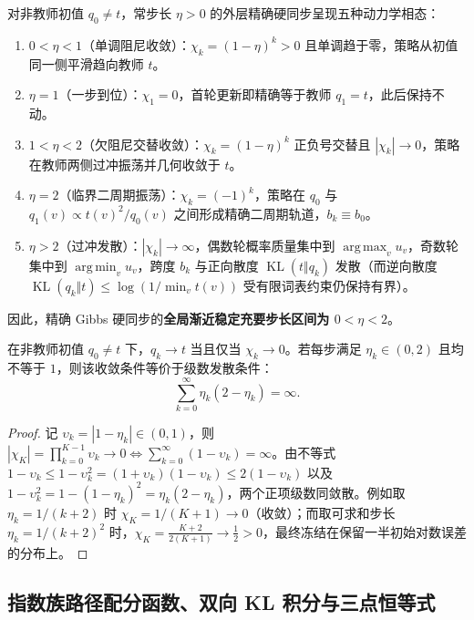 \documentclass[lang=cn,scheme=chinese,openany]{elegantbook}
\newcommand{\KL}{\operatorname{KL}}
\DeclareMathOperator*{\argmax}{arg\,max}
\DeclareMathOperator*{\argmin}{arg\,min}
\begin{document}
\begin{corollary}
对非教师初值 $q_0\ne t$，常步长 $\eta>0$ 的外层精确硬同步呈现五种动力学相态：
\begin{enumerate}
 \item $0<\eta<1$（单调阻尼收敛）：$\chi_k=(1-\eta)^k>0$ 且单调趋于零，策略从初值同一侧平滑趋向教师 $t$。
 \item $\eta=1$（一步到位）：$\chi_1=0$，首轮更新即精确等于教师 $q_1=t$，此后保持不动。
 \item $1<\eta<2$（欠阻尼交替收敛）：$\chi_k=(1-\eta)^k$ 正负号交替且 $|\chi_k|\to 0$，策略在教师两侧过冲振荡并几何收敛于 $t$。
 \item $\eta=2$（临界二周期振荡）：$\chi_k=(-1)^k$，策略在 $q_0$ 与 $q_1(v)\propto t(v)^2/q_0(v)$ 之间形成精确二周期轨道，$b_k\equiv b_0$。
 \item $\eta>2$（过冲发散）：$|\chi_k|\to\infty$，偶数轮概率质量集中到 $\argmax_v u_v$，奇数轮集中到 $\argmin_v u_v$，跨度 $b_k$ 与正向散度 $\KL(t\Vert q_k)$ 发散（而逆向散度 $\KL(q_k\Vert t)\le\log(1/\min_v t(v))$ 受有限词表约束仍保持有界）。
\end{enumerate}
因此，精确 Gibbs 硬同步的\textbf{全局渐近稳定充要步长区间为 $0<\eta<2$}。
\end{corollary}

\begin{proposition}[变步长序列收敛的充要条件]
在非教师初值 $q_0\ne t$ 下，$q_k\to t$ 当且仅当 $\chi_k\to 0$。若每步满足 $\eta_k\in(0,2)$ 且均不等于 $1$，则该收敛条件等价于级数发散条件：
\begin{equation*}
 \sum_{k=0}^{\infty}\eta_k(2-\eta_k)=\infty.
\end{equation*}
\end{proposition}
\begin{proof}
记 $\upsilon_k=|1-\eta_k|\in(0,1)$，则 $|\chi_K|=\prod_{k=0}^{K-1}\upsilon_k\to 0\Longleftrightarrow \sum_{k=0}^\infty(1-\upsilon_k)=\infty$。由不等式 $1-\upsilon_k\le 1-\upsilon_k^2=(1+\upsilon_k)(1-\upsilon_k)\le 2(1-\upsilon_k)$ 以及 $1-\upsilon_k^2=1-(1-\eta_k)^2=\eta_k(2-\eta_k)$，两个正项级数同敛散。例如取 $\eta_k=1/(k+2)$ 时 $\chi_K=1/(K+1)\to 0$（收敛）；而取可求和步长 $\eta_k=1/(k+2)^2$ 时，$\chi_K=\frac{K+2}{2(K+1)}\to \frac12>0$，最终冻结在保留一半初始对数误差的分布上。
\end{proof}

\subsection{指数族路径配分函数、双向 KL 积分与三点恒等式}
\end{document}
